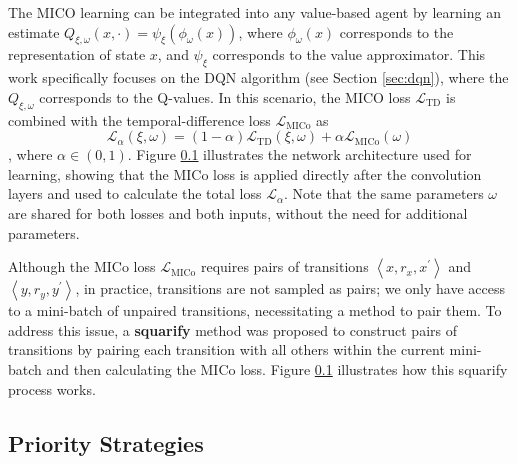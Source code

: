 The MICO learning can be integrated into any value-based agent by learning an estimate $Q_{\xi, \omega}(x, \cdot) = \psi_\xi(\phi_\omega(x))$, where $\phi_\omega(x)$ corresponds to the representation of state $x$, and $\psi_\xi$ corresponds to the value approximator. This work specifically focuses on the DQN algorithm (see Section \ref{sec:dqn}), where the $Q_{\xi, \omega}$ corresponds to the Q-values. In this scenario, the MICO loss $\mathcal{L}_{\text{TD}}$ is combined with the temporal-difference loss $\mathcal{L}_{\text{MICo}}$ as 
\begin{equation}
    \mathcal{L}_\alpha(\xi, \omega) = (1 - \alpha)\mathcal{L}_{\text{TD}}(\xi, \omega) + \alpha \mathcal{L}_{\text{MICo}}(\omega)
\end{equation}
, where $\alpha \in (0, 1)$. 
Figure \ref{} illustrates the network architecture used for learning, showing that the MICo loss is applied directly after the convolution layers and used to calculate the total loss $\mathcal{L}_\alpha$. Note that the same parameters $\omega$ are shared for both losses and both inputs, without the need for additional parameters.



Although the MICo loss $\mathcal{L}_{\text{MICo}}$ requires pairs of transitions $\left\langle x, r_x, x^{\prime}\right\rangle$ and $\left\langle y, r_y, y^{\prime}\right\rangle$, in practice, transitions are not sampled as pairs; we only have access to a mini-batch of unpaired transitions, necessitating a method to pair them. To address this issue, a \textbf{squarify} method \cite{castro2020scalable} was proposed to construct pairs of transitions by pairing each transition with all others within the current mini-batch and then calculating the MICo loss. Figure \ref{} illustrates how this squarify process works.


\subsection{Priority Strategies}


